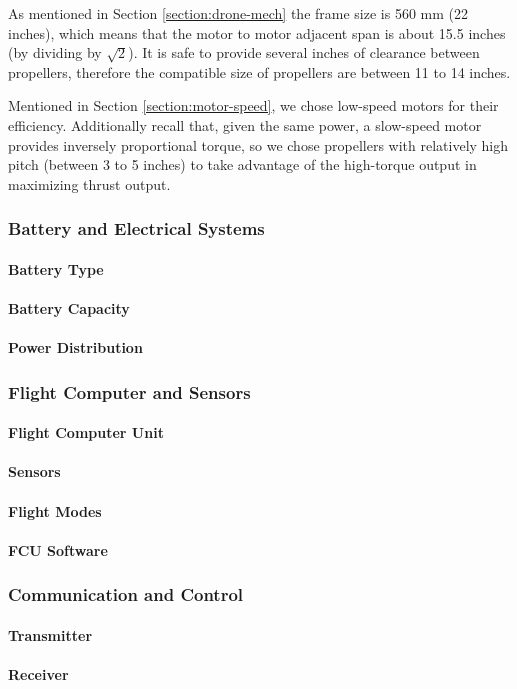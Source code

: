 As mentioned in Section \ref{section:drone-mech} the frame size is 560 mm (22 inches), which means that the motor to motor adjacent span is about 15.5 inches (by dividing by $\sqrt{2}$). It is safe to provide several inches of clearance between propellers, therefore the  compatible size of propellers are between 11 to 14 inches.

Mentioned in Section \ref{section:motor-speed}, we chose low-speed motors for their efficiency. Additionally recall that, given the same power, a slow-speed motor provides inversely proportional torque, so we chose propellers with relatively high pitch (between 3 to 5 inches) to take advantage of the high-torque output in maximizing thrust output.

\subsubsection{Battery and Electrical Systems}
\paragraph{Battery Type}
\paragraph{Battery Capacity}
\paragraph{Power Distribution}

\subsubsection{Flight Computer and Sensors}
\paragraph{Flight Computer Unit}
\paragraph{Sensors}
\paragraph{Flight Modes}
\paragraph{FCU Software}

\subsubsection{Communication and Control}
\paragraph{Transmitter}
\paragraph{Receiver}